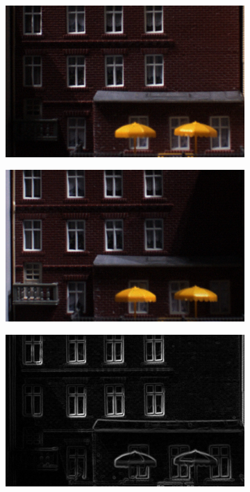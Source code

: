 \documentclass[thesis.tex]{subfiles}
\begin{document}
%
\begin{figure}[p]
    \centering
    \begin{subfigure}[t]{0.48\textwidth}
        \includegraphics[width=\textwidth]{img/pixelNormalizationExample1.png}
        \caption{}
        \label{fig:pixelNormalizationExample1}
    \end{subfigure}
    \begin{subfigure}[t]{0.48\textwidth}
        \includegraphics[width=\textwidth]{img/pixelNormalizationExample2.png}
        \caption{}
        \label{fig:pixelNormalizationExample2}
    \end{subfigure}
    \begin{subfigure}[t]{0.48\textwidth}
        \includegraphics[width=\textwidth]{img/pixelNormalizationExample3.png}

\end{subfigure}
\end{figure}
\end{document}

